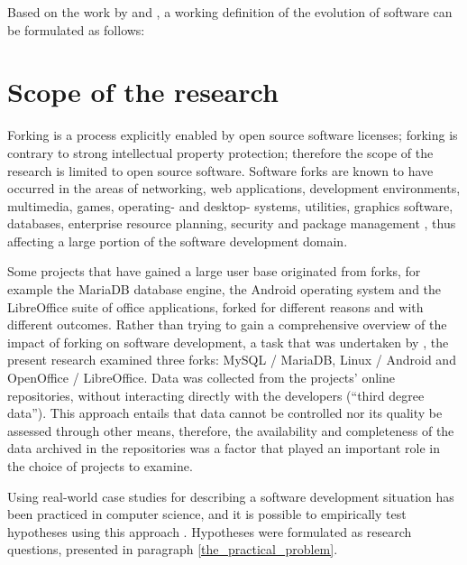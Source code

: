 \noindent
Based on the work by \citet{Nehaniv2006a} and \citet{Yu2006a}, a working definition of the evolution of software can be formulated as follows:



\section{Scope of the research}

Forking is a process explicitly enabled by open source software licenses; forking is contrary to strong intellectual property protection; therefore the scope of the research is limited to open source software. Software forks are known to have occurred in the areas of networking, web applications, development environments, multimedia, games, operating- and desktop- systems, utilities, graphics software, databases, enterprise resource planning, security and package management \citep{Robles2012a}, thus affecting a large portion of the software development domain.

Some projects that have gained a large user base originated from forks, for example the MariaDB database engine, the Android operating system and the LibreOffice suite of office applications, forked for different reasons and with different outcomes. Rather than trying to gain a comprehensive overview of the impact of forking on software development, a task that was undertaken by \citet{Robles2012a}, the present research examined three forks: MySQL / MariaDB, Linux / Android and OpenOffice / LibreOffice. Data was collected from the projects' online repositories, without interacting directly with the developers (“third degree data”). This approach entails that data cannot be controlled nor its quality be assessed through other means, therefore, the availability and completeness of the data archived in the repositories was a factor that played an important role in the choice of projects to examine.

Using real-world case studies for describing a software development situation has been practiced in computer science, and it is possible to empirically test hypotheses using this approach \citep{Runeson2009b}. Hypotheses were formulated as research questions, presented in paragraph \ref{the_practical_problem}.


